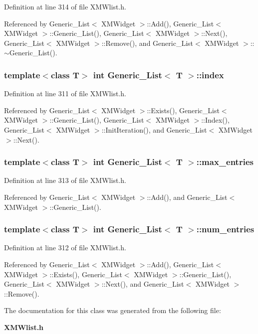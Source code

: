 Definition at line 314 of file XMWlist.h.

Referenced by Generic\_\-List$<$ XMWidget $>$::Add(), Generic\_\-List$<$ XMWidget $>$::Generic\_\-List(), Generic\_\-List$<$ XMWidget $>$::Next(), Generic\_\-List$<$ XMWidget $>$::Remove(), and Generic\_\-List$<$ XMWidget $>$::$\sim$Generic\_\-List().
\subsubsection{\setlength{\rightskip}{0pt plus 5cm}template$<$class T$>$ int Generic\_\-List$<$ T $>$::index\hspace{0.3cm}{\tt  [protected]}}\label{classGeneric__List_n0}




Definition at line 311 of file XMWlist.h.

Referenced by Generic\_\-List$<$ XMWidget $>$::Exists(), Generic\_\-List$<$ XMWidget $>$::Generic\_\-List(), Generic\_\-List$<$ XMWidget $>$::Index(), Generic\_\-List$<$ XMWidget $>$::Init\-Iteration(), and Generic\_\-List$<$ XMWidget $>$::Next().
\subsubsection{\setlength{\rightskip}{0pt plus 5cm}template$<$class T$>$ int Generic\_\-List$<$ T $>$::max\_\-entries\hspace{0.3cm}{\tt  [protected]}}\label{classGeneric__List_n2}




Definition at line 313 of file XMWlist.h.

Referenced by Generic\_\-List$<$ XMWidget $>$::Add(), and Generic\_\-List$<$ XMWidget $>$::Generic\_\-List().
\subsubsection{\setlength{\rightskip}{0pt plus 5cm}template$<$class T$>$ int Generic\_\-List$<$ T $>$::num\_\-entries\hspace{0.3cm}{\tt  [protected]}}\label{classGeneric__List_n1}




Definition at line 312 of file XMWlist.h.

Referenced by Generic\_\-List$<$ XMWidget $>$::Add(), Generic\_\-List$<$ XMWidget $>$::Exists(), Generic\_\-List$<$ XMWidget $>$::Generic\_\-List(), Generic\_\-List$<$ XMWidget $>$::Next(), and Generic\_\-List$<$ XMWidget $>$::Remove().

The documentation for this class was generated from the following file:\begin{CompactItemize}
\item 
{\bf XMWlist.h}\end{CompactItemize}
